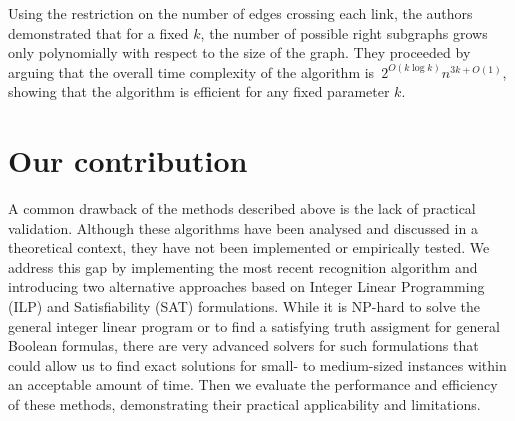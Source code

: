 Using the restriction on the number of edges crossing each link, the authors demonstrated that for a fixed \(k\), the number of possible right subgraphs grows only polynomially with respect to the size of the graph. They proceeded by arguing that the overall time complexity of the algorithm is~\(2^{O(k \log k)}n^{3k + O(1)}\), showing that the algorithm is efficient for any fixed parameter \(k\).


\section{Our contribution}

A common drawback of the methods described above is the lack of practical validation. Although these algorithms have been analysed and discussed in a theoretical context, they have not been implemented or empirically tested. We address this gap by implementing the most recent recognition algorithm and introducing two alternative approaches based on Integer Linear Programming (ILP) and Satisfiability (SAT) formulations. While it is NP-hard to solve the general integer linear program or to find a satisfying truth assigment for general Boolean formulas, there are very advanced solvers for such formulations that could allow us to find exact solutions for small- to medium-sized instances within an acceptable amount of time. Then we evaluate the performance and efficiency of these methods, demonstrating their practical applicability and limitations.
